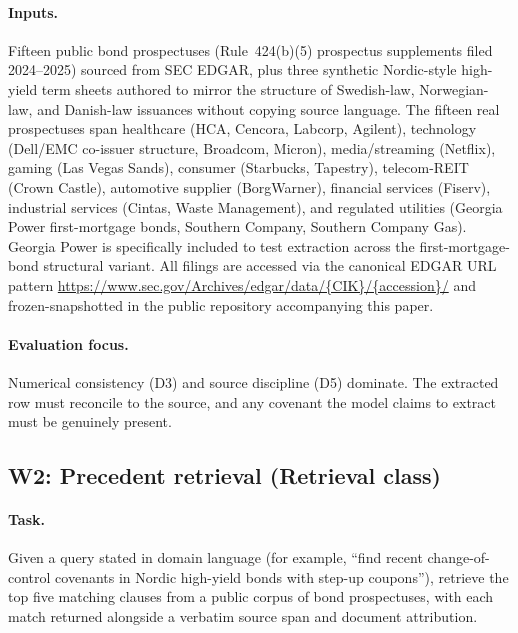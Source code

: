 \documentclass[11pt]{article}
\begin{document}
\paragraph{Inputs.} Fifteen public bond prospectuses (Rule~424(b)(5) prospectus supplements filed 2024--2025) sourced from SEC EDGAR, plus three synthetic Nordic-style high-yield term sheets authored to mirror the structure of Swedish-law, Norwegian-law, and Danish-law issuances without copying source language. The fifteen real prospectuses span healthcare (HCA, Cencora, Labcorp, Agilent), technology (Dell/EMC co-issuer structure, Broadcom, Micron), media/streaming (Netflix), gaming (Las Vegas Sands), consumer (Starbucks, Tapestry), telecom-REIT (Crown Castle), automotive supplier (BorgWarner), financial services (Fiserv), industrial services (Cintas, Waste Management), and regulated utilities (Georgia Power first-mortgage bonds, Southern Company, Southern Company Gas). Georgia Power is specifically included to test extraction across the first-mortgage-bond structural variant. All filings are accessed via the canonical EDGAR URL pattern \url{https://www.sec.gov/Archives/edgar/data/\{CIK\}/\{accession\}/} and frozen-snapshotted in the public repository accompanying this paper.

\paragraph{Evaluation focus.} Numerical consistency (D3) and source discipline (D5) dominate. The extracted row must reconcile to the source, and any covenant the model claims to extract must be genuinely present.

\subsection{W2: Precedent retrieval (Retrieval class)}

\paragraph{Task.} Given a query stated in domain language (for example, ``find recent change-of-control covenants in Nordic high-yield bonds with step-up coupons''), retrieve the top five matching clauses from a public corpus of bond prospectuses, with each match returned alongside a verbatim source span and document attribution.
\end{document}
